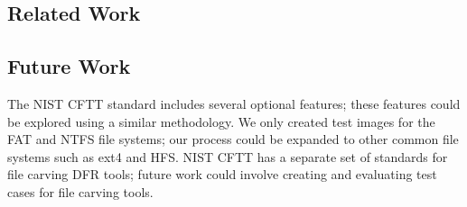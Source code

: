 \subsection{Related Work}

\subsection{Future Work}
The NIST CFTT standard\cite{meta:dfr:standards} includes several optional features; these features could be explored using a similar methodology.
We only created test images for the FAT and NTFS file systems; our process could be expanded to other common file systems such as ext4 and HFS.
NIST CFTT has a separate set of standards for file carving DFR tools; future work could involve creating and evaluating test cases for file carving tools.

